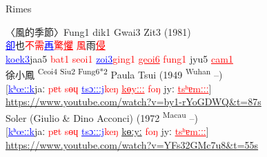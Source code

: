 \documentclass{beamer}
\begin{document}
\begin{frame}[fragile]{Rimes}

〈風的季節〉Fung1 dik1 Gwai3 Zit3 (1981)\\
\medskip
\textcolor{blue}{\underline{卻}}\quad 也\textcolor{red}{不需}\textcolor{blue}{\underline{再}}\quad \textcolor{red}{驚\underline{懼} \quad 風}雨\textcolor{red}{\underline{侵}}\\
\textcolor{blue}{\underline{koek3}}\quad jaa5 \textcolor{red}{bat1 seoi1 }\textcolor{blue}{\underline{zoi3}}\quad \textcolor{red}{ging1 \underline{geoi6} \quad fung1 }jyu5 \textcolor{red}{\underline{cam1}}\\

\medskip
徐小鳳 \textsuperscript{Ceoi4 Siu2 Fung6*2} Paula Tsui (1949 \textsuperscript{Wuhan} –)\\
{[}\textcolor{blue}{\underline{kʰœːːk}}\quad jaː \textcolor{red}{pɐt sɵɥ }\textcolor{blue}{\underline{tsɔːːːj}}\quad \textcolor{red}{keŋ \underline{kɵyːːː} \quad foŋ }jyː \textcolor{red}{\underline{tsʰɐmːːː}}{]}\\
{\tiny \url{https://www.youtube.com/watch?v=by1-rYoGDWQ&t=87s}}\\
Soler (Giulio \& Dino Acconci) (1972 \textsuperscript{Macau} –)\\
{[}\textcolor{blue}{\underline{kʰœːːk}}\quad jaː \textcolor{red}{pɐt sɵɥ }\textcolor{blue}{\underline{tsɔːːːj}}\quad \textcolor{red}{keŋ} \underline{kɵːyː} \quad \textcolor{red}{foŋ }jyː \textcolor{red}{\underline{tsʰɐmːːː}}{]}\\
{\tiny \url{https://www.youtube.com/watch?v=YFs32GMc7u8&t=55s}}\\

\end{frame}
\end{document}
